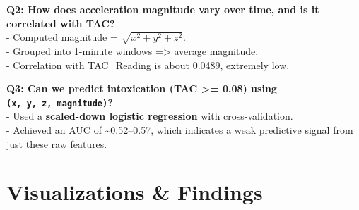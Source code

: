 \documentclass[
  letterpaper,
  DIV=11,
  numbers=noendperiod]{scrartcl}
\begin{document}
\textbf{Q2: How does acceleration magnitude vary over time, and is it
correlated with TAC?}\\
- Computed magnitude = \(\sqrt{x^2 + y^2 + z^2}\).\\
- Grouped into 1-minute windows =\textgreater{} average magnitude.\\
- Correlation with TAC\_Reading is about 0.0489, extremely low.

\textbf{Q3: Can we predict intoxication (TAC \textgreater= 0.08) using
\texttt{(x,\ y,\ z,\ magnitude)}?}\\
- Used a \textbf{scaled-down logistic regression} with
cross-validation.\\
- Achieved an AUC of \textasciitilde0.52--0.57, which indicates a weak
predictive signal from just these raw features.

\section{Visualizations \& Findings}\label{visualizations-findings}
\end{document}
